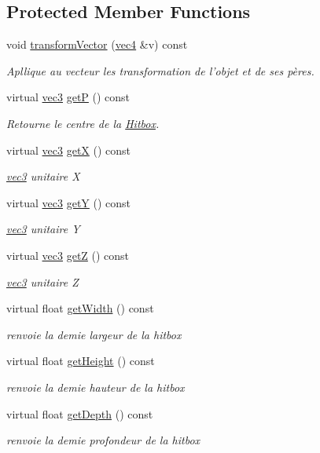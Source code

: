 \subsection*{Protected Member Functions}
\begin{DoxyCompactItemize}
\item 
void \hyperlink{class_objet_a68db2971ff359da981bc0fb73a164b9f}{transform\+Vector} (\hyperlink{structvec4}{vec4} \&v) const 
\begin{DoxyCompactList}\small\item\em Apllique au vecteur les transformation de l'objet et de ses pères. \end{DoxyCompactList}\item 
virtual \hyperlink{structvec3}{vec3} \hyperlink{class_objet_a470565255788e83680e544631b5800ff}{get\+P} () const 
\begin{DoxyCompactList}\small\item\em Retourne le centre de la \hyperlink{class_hitbox}{Hitbox}. \end{DoxyCompactList}\item 
virtual \hyperlink{structvec3}{vec3} \hyperlink{class_objet_afaf96803ebfa415f7e3cbb1548bc1820}{get\+X} () const 
\begin{DoxyCompactList}\small\item\em \hyperlink{structvec3}{vec3} unitaire X \end{DoxyCompactList}\item 
virtual \hyperlink{structvec3}{vec3} \hyperlink{class_objet_a861ee97362660b8b4e013ac08bcacbfc}{get\+Y} () const 
\begin{DoxyCompactList}\small\item\em \hyperlink{structvec3}{vec3} unitaire Y \end{DoxyCompactList}\item 
virtual \hyperlink{structvec3}{vec3} \hyperlink{class_objet_ae7f55830cdd18cfc3ceb9b556f25be23}{get\+Z} () const 
\begin{DoxyCompactList}\small\item\em \hyperlink{structvec3}{vec3} unitaire Z \end{DoxyCompactList}\item 
virtual float \hyperlink{class_objet_ae8b213466c38b3bcaa34144cc708da65}{get\+Width} () const 
\begin{DoxyCompactList}\small\item\em renvoie la demie largeur de la hitbox \end{DoxyCompactList}\item 
virtual float \hyperlink{class_objet_a05bcb1a581309e6785be09058ff68450}{get\+Height} () const 
\begin{DoxyCompactList}\small\item\em renvoie la demie hauteur de la hitbox \end{DoxyCompactList}\item 
virtual float \hyperlink{class_objet_a27f49df80d4efc35530987cd8683dde0}{get\+Depth} () const 
\begin{DoxyCompactList}\small\item\em renvoie la demie profondeur de la hitbox \end{DoxyCompactList}\end{DoxyCompactItemize}
